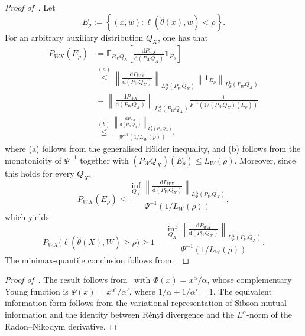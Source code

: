 \documentclass[11pt]{article}
\theoremstyle{definition}
\theoremstyle{remark}
\newcommand{\1}{\boldsymbol{1}}
\begin{document}
\begin{proof}[Proof of~]
Let
\[
E_\rho
:=
\left\{
(x,w):
\ell(\widehat\theta(x),w)<\rho
\right\}.
\]
For an arbitrary auxiliary distribution $Q_X$, one has that
\begin{align}
P_{WX}(E_\rho)
&=
\mathbb E_{P_WQ_X}
\left[\frac{\mathrm dP_{WX}}{\mathrm d(P_WQ_X)}\1_{E_\rho}
\right] \\
&\overset{(a)}{\leq} \left\|
\frac{\mathrm dP_{WX}}{\mathrm d(P_WQ_X)}
\right\|_{L_\Phi^{\mathrm A}(P_WQ_X)}
\left\|
\1_{E_\rho}
\right\|_{L_\Psi^{\mathrm L}(P_WQ_X)} \\
&= \left\|
\frac{\mathrm dP_{WX}}{\mathrm d(P_WQ_X)}
\right\|_{L_\Phi^{\mathrm A}(P_WQ_X)} \frac{
1
}{
\Psi^{-1}
\left(
1/(P_WQ_X)(E_\rho)
\right)
} \\ 
&\overset{(b)}{\leq} \frac{
\left\|
\frac{\mathrm dP_{WX}}{\mathrm d(P_WQ_X)}
\right\|_{L_\Phi^{\mathrm A}(P_WQ_X)}
}{
\Psi^{-1}
\left(
1/L_W(\rho)
\right)
}.
\end{align}
where (a) follows from the generalised H\"older inequality, and (b) follows
from the monotonicity of $\Psi^{-1}$ together with
$(P_WQ_X)(E_\rho)\leq L_W(\rho)$.
Moreover, since this holds for every $Q_X$,
\begin{equation}
P_{WX}(E_\rho)
\leq
\frac{\inf_{Q_X} 
\left\|
\frac{\mathrm dP_{WX}}{\mathrm d(P_WQ_X)}
\right\|_{L_\Phi^{\mathrm A}(P_WQ_X)}
}{
\Psi^{-1}
\left(
1/L_W(\rho)
\right)
},
\end{equation}
which yields
\begin{equation}
P_{WX}\bigl(\ell(\widehat\theta(X),W)\geq\rho\bigr)
\geq
1-\frac{\inf_{Q_X}
\left\|
\frac{\mathrm dP_{WX}}{\mathrm d(P_WQ_X)}
\right\|_{L_\Phi^{\mathrm A}(P_WQ_X)}
}{
\Psi^{-1}
\left(
1/L_W(\rho)
\right)
}.
\end{equation}
The minimax-quantile conclusion follows from~.
\end{proof}

\begin{proof}[Proof of~]
The result follows from~ with
$\Phi(x)=x^\alpha/\alpha$, whose complementary Young function is
$\Psi(x)=x^{\alpha'}/\alpha'$, where
$1/\alpha+1/\alpha'=1$. The equivalent information form follows from the
variational representation of Sibson mutual information and the identity between
R\'enyi divergence and the $L^\alpha$-norm of the Radon--Nikodym derivative.
\end{proof}
\end{document}
